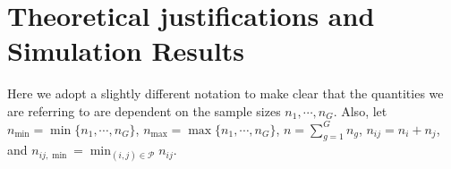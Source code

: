 \documentclass[times,sort&compress,3p]{elsarticle}
\theoremstyle{plain}%
\theoremstyle{definition}
\def\log{\hbox{log}}
\def\log{\hbox{log}}
\def\trans{^{\rm T}}
\newcommand{\uF}       {\mbox{\boldmath$F$}}
\newcommand{\uS}       {\mbox{\boldmath$S$}}
\newcommand{\uX}       {\mbox{\boldmath$X$}}
\begin{document}

\section{Theoretical justifications and Simulation Results} \label{sec:theori}
Here we adopt a slightly different notation to make clear that the quantities we are referring to are dependent on the sample sizes $n_1, \cdots, n_{G}$. Also, let $n_{\min} = \min\{n_1,\cdots, n_{G}\}$, $n_{\max} = \max\{n_1,\cdots, n_{G}\}$, $n = \sum^{G}_{g=1}n_g$, $n_{ij} = n_i + n_j$, and $n_{ij,\min} = \min_{(i,j) \in \mathcal{P}} n_{ij}$. 
\end{document}
